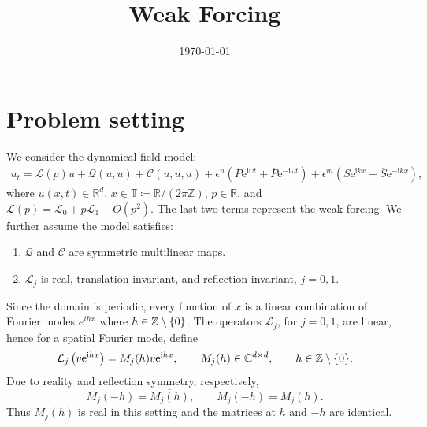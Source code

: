 \documentclass[11pt]{article}
\title{Weak Forcing}
\author{}
\date{\today}
\newcommand{\ii}{\mathrm{i}}
\newcommand{\ee}{\mathrm{e}}
\newcommand{\cQ}{\mathcal{Q}}
\newcommand{\cC}{\mathcal{C}}
\newcommand{\cL}{\mathcal{L}}
\newcommand{\T}{\mathbb{T}}
\begin{document}




\section{Problem setting}
We consider the dynamical field model:
\begin{align}
 u_t=\cL(p)u+\cQ(u,u)+\cC(u,u,u) +\epsilon^n\left(P\ee^{\ii\omega t}+\overline P\ee^{-\ii\omega t}\right)
 +\epsilon^m\left(S\ee^{\ii kx}+\overline S\ee^{-\ii kx}\right),
 \label{eq:pde}
\end{align}
where $u(x,t)\in\mathbb R^d$, $x\in\T\coloneqq\mathbb R/(2\pi\mathbb Z)$,
$p\in\mathbb R$, and $\cL(p)=\cL_0+p\cL_1+O(p^2)$. The last two terms represent the weak forcing. We further assume the model satisfies:
\begin{enumerate}
 \item $\cQ$ and $\cC$ are symmetric multilinear maps.
 \item $\cL_j$ is real, translation invariant, and reflection invariant,
 $j=0,1$.
\end{enumerate}

Since the domain is periodic, every function of $x$ is a linear combination of Fourier modes $e^{ihx}$ where $h\in \mathbb{Z}\setminus \{0\}$. The operators $\cL_j$, for $j=0,1$, are linear, hence for a spatial Fourier mode, define
\begin{equation}
 \cL_j\left(v\ee^{\ii hx}\right)=M_j(h)v\ee^{\ii hx},
 \qquad M_j(h)\in\CC^{d\times d}, \qquad h\in\mathbb Z\setminus \{0\}.
 \label{eq:M_matrix}
\end{equation}
Due to reality and reflection symmetry, respectively,
\begin{equation}
 M_j(-h)=\overline{M_j(h)},
 \qquad M_j(-h)=M_j(h).
 \label{eq:M-symmetries}
\end{equation}
Thus $M_j(h)$ is real in this setting and the matrices at $h$ and $-h$ are identical.
\end{document}
